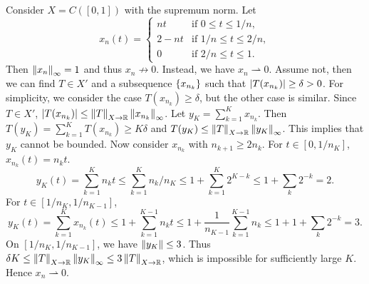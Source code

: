\begin{example}
    Consider $X = C([0,1])$ with the supremum norm. Let 
    \begin{equation*}
        x_n(t) = \begin{cases}
            nt & \text{if } 0\leq t\leq 1/n,\\
            2-nt & \text{if } 1/n\leq t\leq 2/n,\\
            0 & \text{if } 2/n\leq t\leq 1.
        \end{cases}
    \end{equation*}
    Then $\left\lVert {x_n} \right\rVert_\infty = 1$ and thus $x_n\not\to 0$. Instead, 
    we have $x_n\rightharpoonup 0$. Assume not, then we can find 
    $T\in X'$ and a subsequence $\left\{ {x_{n_k}} \right\}$ such that 
    $\left\lvert {T(x_{n_k})} \right\rvert \geq \delta > 0$. For simplicity, we consider 
    the case $T(x_{n_k})\geq\delta$, but the other case is similar. 
    Since $T\in X'$, $\left\lvert {T(x_{n_k})} \right\rvert\leq \left\lVert {T} \right\rVert_{X\to\mathbb{R}}
    \left\lVert {x_{n_k}} \right\rVert_{\infty}$. Let $y_{K} = \sum_{k=1}^{K}x_{n_k}$. 
    Then $T(y_K) = \sum_{k=1}^{K}T(x_{n_k})\geq K\delta$ and 
    $T(y_K)\leq \left\lVert {T} \right\rVert_{X\to\mathbb{R}}\left\lVert {y_K} \right\rVert_\infty$. This implies 
    that $y_K$ cannot be bounded. Now consider $x_{n_k}$ with 
    $n_{k+1}\geq 2n_k$. For $t\in[0,1/n_K]$, $x_{n_k}(t) = n_kt$. 
    \begin{equation*}
        y_K(t) = \sum_{k=1}^{K} n_kt \leq \sum_{k=1}^{K} n_k/n_K 
        \leq 1 + \sum_{k=1}^{K} 2^{K-k} \leq 1 + \sum_k 2^{-k} = 2.
    \end{equation*}
    For $t\in[1/n_K,1/n_{K-1}]$, 
    \begin{equation*}
        y_K(t) = \sum_{k=1}^{K} x_{n_k}(t) 
        \leq 1 + \sum_{k=1}^{K-1} n_kt 
        \leq 1 + \frac{1}{n_{K-1}}\sum_{k=1}^{K-1} n_k 
        \leq 1 + 1 + \sum_k 2^{-k} = 3. 
    \end{equation*}
    On $[1/n_K,1/n_{K-1}]$, we have $\left\lVert {y_K} \right\rVert\leq 3$. 
    Thus $\delta K\leq\left\lVert {T} \right\rVert_{X\to\mathbb{R}}\left\lVert {y_K} \right\rVert_\infty
    \leq 3\left\lVert {T} \right\rVert_{X\to\mathbb{R}}$, which is impossible for 
    sufficiently large $K$. Hence $x_n\rightharpoonup 0$.
\end{example}

